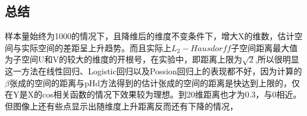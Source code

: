 \subsection{总结}
样本量始终为1000的情况下，且降维后的维度不变条件下，增大X的维数，估计空间与实际空间的差距呈上升趋势。而且实际上$L_2-Hausdorff$子空间距离最大值为子空间U和V的较大的维度的开根号，在实验中，即距离上限为$\sqrt{2}$,所以很明显这一方法在线性回归、Logistic回归以及Possion回归上的表现都不好，因为计算的$\beta$张成的空间的距离与pHd方法得到的估计张成的空间的距离是快达到上限的，仅在Y是X的cos相关函数的情况下效果较为理想。到20维距离也才为0.3，与0相近。但图像上还有些点显示出随维度上升距离反而还有下降的情况，


